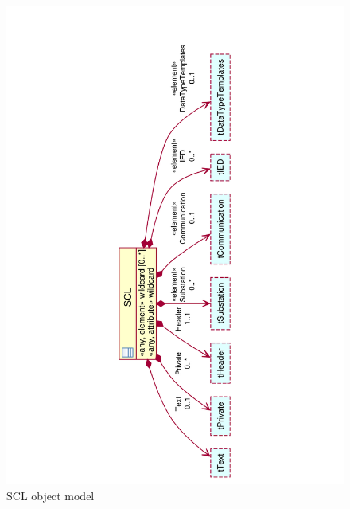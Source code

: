\begin{landscape}
	\begin{figure}
	  \includegraphics[angle=-90, width=1.0\linewidth]
	  				{chapters/ch-scl/figures/SCL-uml-Deept2}
	  \caption{SCL object model}  
	  \label{fig:pdf-SCL-uml-deept2}
	\end{figure}
\end{landscape}


